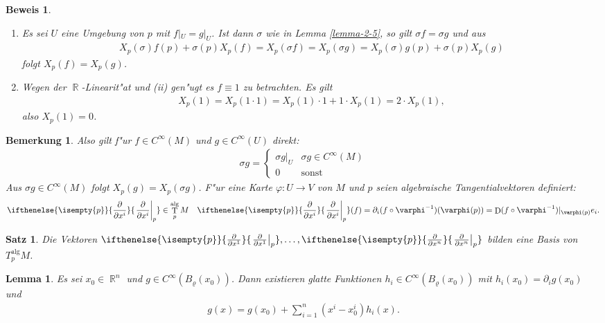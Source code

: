 \documentclass[paper=A4, twoside, chapterprefix=true, bibliography=totoc, headsepline]{scrbook}
\let\temp\phi
\let\phi\varphi
\let\varphi\temp
\let\temp\theta
\let\theta\vartheta
\let\vartheta\temp
\let\temp\epsilon
\let\epsilon\varepsilon
\let\varepsilon\temp
\let\temp\rho
\let\rho\varrho
\let\varrho\temp
\DeclareMathOperator{\R}{\mathbb{R}}
\DeclareMathOperator{\D}{D} %
\DeclareMathOperator{\T}{T} %
\newcommand{\pdifffrac}[3][]{\ifthenelse{\isempty{#1}}{\frac{\partial #2}{\partial #3}}{\left. \frac{\partial #2}{\partial #3} \right|_{#1}}}
\theoremstyle{plain}
\newtheorem{Satz}[Dfn]{Satz}
\newtheorem{Lemma}[Dfn]{Lemma}
\theoremstyle{nonumberplain}
\newtheorem{bem}{Bemerkung}
\newtheorem{bew}{Beweis}
\theoremstyle{empty}
\theoremstyle{break}
\begin{document}
\begin{bew}\begin{enumerate}[label=(\roman*),widest=ii,leftmargin=*]
\item[(ii)]
	Es sei $U$ eine Umgebung von $p$ mit $f|_U = g|_U$. Ist dann $\sigma$ wie in Lemma \ref{lemma-2-5}, so gilt $\sigma f = \sigma g$ und aus
	\begin{align*}
		X_p(\sigma)f(p)+\sigma(p)X_p(f) = X_{p}(\sigma f) = X_p(\sigma g) = X_p(\sigma) g(p) + \sigma(p) X_p(g)
	\end{align*}
	folgt $X_p(f) = X_p(g)$.\\
\item[(i)]
	Wegen der $\R$-Linearit"at und (ii) gen"ugt es $f \equiv 1$ zu betrachten. Es gilt
	\begin{align*}
		X_p(1) = X_p(1 \cdot 1) = X_p(1) \cdot 1 + 1 \cdot X_p(1) = 2 \cdot X_p(1),
	\end{align*}
	also $X_p(1) = 0$.
\end{enumerate}\end{bew}

\begin{bem}
  Also gilt f"ur $f \in C^{\infty}(M)$ und $g \in C^{\infty}(U)$ direkt:
  \begin{align*}
    \sigma g =
    \begin{cases}
      \sigma g|_U & \sigma g \in C^{\infty}(M)\\
      0 & \text{sonst}
    \end{cases}
  \end{align*}
  Aus $\sigma g \in C^{\infty}(M)$ folgt $X_p(g) = X_p(\sigma g)$.
  F"ur eine Karte $\phi \colon U \to V$ von $M$ und $p$ seien algebraische Tangentialvektoren definiert:
  \begin{align*}
    \pdifffrac[p]{}{x^i} \in \T_p^{\text{alg}}M && \pdifffrac[p]{}{x^i}(f) = \partial_i(f \circ \phi^{-1})(\phi(p)) = \D(f \circ \phi^{-1})|_{\phi(p)}e_i.
  \end{align*}
\end{bem}

\begin{Satz}\label{satz-2-7}
  Die Vektoren $\pdifffrac[p]{}{x^1},\ldots,\pdifffrac[p]{}{x^n}$ bilden eine Basis von $T_p^{\text{alg}}M$.
\end{Satz}

\begin{Lemma}
  Es sei $x_0 \in \R^n$ und $g \in C^{\infty}(B_{\rho}(x_0))$.
  Dann existieren glatte Funktionen $h_i \in C^{\infty}(B_{\rho}(x_0))$ mit $h_i(x_0) = \partial_ig(x_0)$ und 
  \begin{align*}
    g(x) = g(x_0) + \sum_{i=1}^n(x^i-x_0^i)h_i(x).
  \end{align*}
\end{Lemma}
\end{document}
